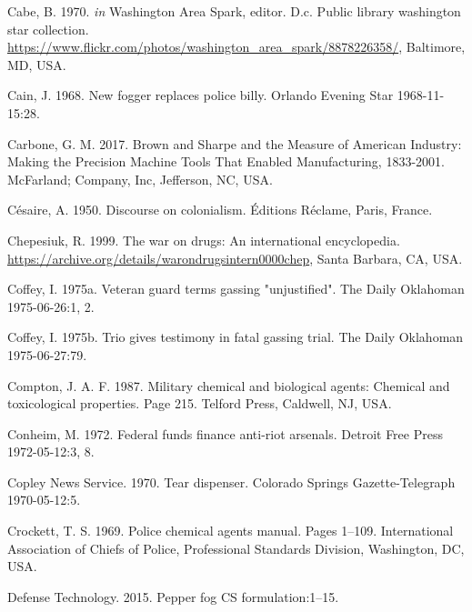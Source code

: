 \documentclass[
  11pt,
]{krantz}
\newlength{\cslhangindent}
\newenvironment{CSLReferences}[2] %
 {%
  \setlength{\parindent}{0pt}
  \ifodd #1 \everypar{\setlength{\hangindent}{\cslhangindent}}\ignorespaces\fi
  \ifnum #2 > 0
  \setlength{\parskip}{#2\baselineskip}
  \fi
 }%
 {}
\begin{document}
\begin{CSLReferences}{1}{0}
\leavevmode{}%
Cabe, B. 1970. \emph{in} Washington Area Spark, editor. D.c. Public library washington star collection. \url{https://www.flickr.com/photos/washington_area_spark/8878226358/}, Baltimore, MD, USA.

\leavevmode{}%
Cain, J. 1968. New fogger replaces police billy. Orlando Evening Star 1968-11-15:28.

\leavevmode{}%
Carbone, G. M. 2017. {Brown and Sharpe and the Measure of American Industry: Making the Precision Machine Tools That Enabled Manufacturing, 1833-2001}. McFarland; Company, Inc, Jefferson, NC, USA.

\leavevmode{}%
Césaire, A. 1950. Discourse on colonialism. Éditions Réclame, Paris, France.

\leavevmode{}%
Chepesiuk, R. 1999. The war on drugs: An international encyclopedia. \url{https://archive.org/details/warondrugsintern0000chep}, Santa Barbara, CA, USA.

\leavevmode{}%
Coffey, I. 1975a. Veteran guard terms gassing "unjustified". The Daily Oklahoman 1975-06-26:1, 2.

\leavevmode{}%
Coffey, I. 1975b. Trio gives testimony in fatal gassing trial. The Daily Oklahoman 1975-06-27:79.

\leavevmode{}%
Compton, J. A. F. 1987. Military chemical and biological agents: Chemical and toxicological properties. Page 215. Telford Press, Caldwell, NJ, USA.

\leavevmode{}%
Conheim, M. 1972. Federal funds finance anti-riot arsenals. Detroit Free Press 1972-05-12:3, 8.

\leavevmode{}%
Copley News Service. 1970. Tear dispenser. Colorado Springs Gazette-Telegraph 1970-05-12:5.

\leavevmode{}%
Crockett, T. S. 1969. Police chemical agents manual. Pages 1--109. International Association of Chiefs of Police, Professional Standards Division, Washington, DC, USA.

\leavevmode{}%
Defense Technology. 2015. Pepper fog CS formulation:1--15.


\end{CSLReferences}
\end{document}

